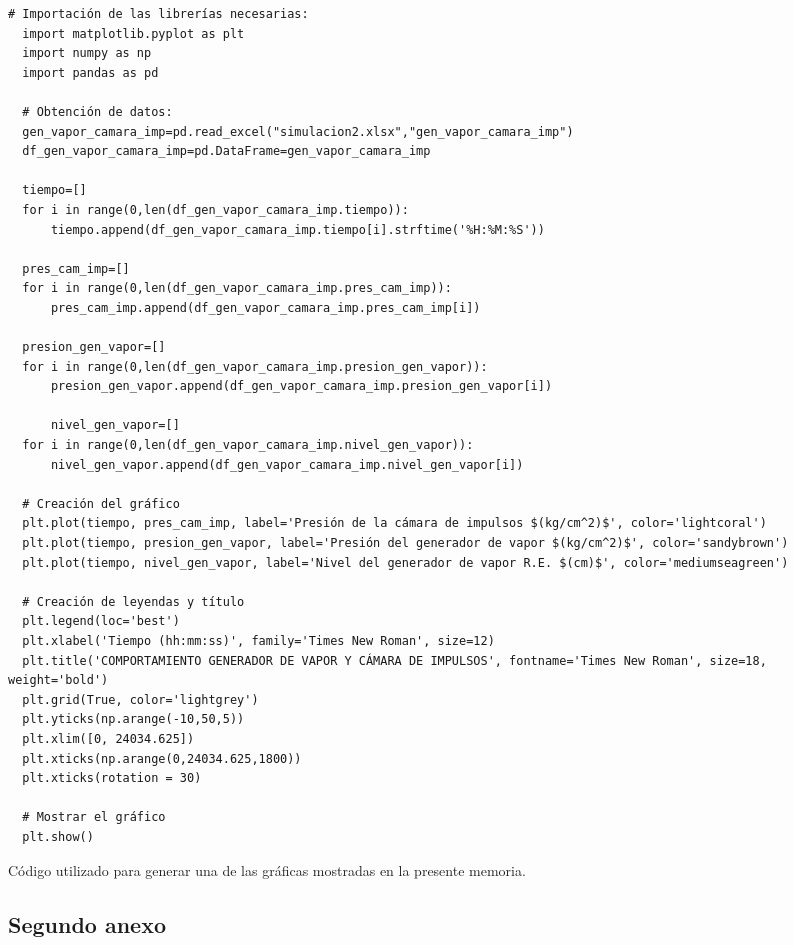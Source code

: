 \begin{code}[H]
\begin{lstlisting}[firstnumber=1, breakindent=55pt]
  # Importación de las librerías necesarias:
  import matplotlib.pyplot as plt
  import numpy as np
  import pandas as pd
  
  # Obtención de datos:
  gen_vapor_camara_imp=pd.read_excel("simulacion2.xlsx","gen_vapor_camara_imp")
  df_gen_vapor_camara_imp=pd.DataFrame=gen_vapor_camara_imp
  
  tiempo=[]
  for i in range(0,len(df_gen_vapor_camara_imp.tiempo)):
      tiempo.append(df_gen_vapor_camara_imp.tiempo[i].strftime('%H:%M:%S'))
  
  pres_cam_imp=[]
  for i in range(0,len(df_gen_vapor_camara_imp.pres_cam_imp)):
      pres_cam_imp.append(df_gen_vapor_camara_imp.pres_cam_imp[i])
  
  presion_gen_vapor=[]
  for i in range(0,len(df_gen_vapor_camara_imp.presion_gen_vapor)):
      presion_gen_vapor.append(df_gen_vapor_camara_imp.presion_gen_vapor[i])
  
      nivel_gen_vapor=[]
  for i in range(0,len(df_gen_vapor_camara_imp.nivel_gen_vapor)):
      nivel_gen_vapor.append(df_gen_vapor_camara_imp.nivel_gen_vapor[i])
  
  # Creación del gráfico
  plt.plot(tiempo, pres_cam_imp, label='Presión de la cámara de impulsos $(kg/cm^2)$', color='lightcoral')
  plt.plot(tiempo, presion_gen_vapor, label='Presión del generador de vapor $(kg/cm^2)$', color='sandybrown')
  plt.plot(tiempo, nivel_gen_vapor, label='Nivel del generador de vapor R.E. $(cm)$', color='mediumseagreen')
  
  # Creación de leyendas y título
  plt.legend(loc='best')
  plt.xlabel('Tiempo (hh:mm:ss)', family='Times New Roman', size=12)
  plt.title('COMPORTAMIENTO GENERADOR DE VAPOR Y CÁMARA DE IMPULSOS', fontname='Times New Roman', size=18, weight='bold')
  plt.grid(True, color='lightgrey')
  plt.yticks(np.arange(-10,50,5))
  plt.xlim([0, 24034.625])
  plt.xticks(np.arange(0,24034.625,1800))
  plt.xticks(rotation = 30)
  
  # Mostrar el gráfico
  plt.show()
\end{lstlisting}
\vspace{-5pt}
\caption{Código utilizado para generar una de las gráficas mostradas en la presente memoria.}
\label{cod:codigo_graficas}
\end{code}



\newpage
\subsection{Segundo anexo}
